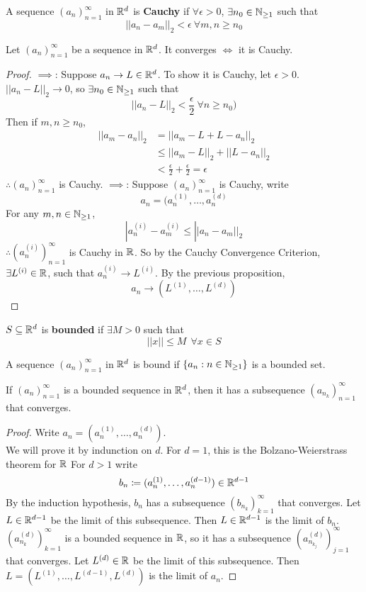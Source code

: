 \documentclass[openany]{report}
\begin{document}
\begin{definition}
    A sequence $(a_n)_{n=1}^\infty$ in $\mathbb{R}^d$ is \textbf{Cauchy} if  $\forall \epsilon > 0$, $\exists n_0 \in \mathbb{N}_{\geq 1}$ such that 
    $$||a_n - a_m||_2 < \epsilon \ \forall m,n \geq n_0$$
\end{definition}

\begin{theorem}
Let $(a_n)_{n=1}^\infty$ be a sequence in $\mathbb{R}^d$. It converges $\iff$ it is Cauchy.
\end{theorem}

\begin{proof}
    $\implies$: Suppose $a_n \rightarrow L \in \mathbb{R}^d$. To show it is Cauchy, let $\epsilon > 0$. $||a_n - L||_2 \rightarrow 0$, so $\exists n_0 \in \mathbb{N}_{\geq 1}$ such that 
    $$||a_n - L||_2 < \frac{\epsilon}{2} \ \forall n \geq n_0)$$
    Then if $m,n \geq n_0$, 
    \begin{align*}
        ||a_m - a_n||_2 &= ||a_m - L + L - a_n||_2\\
        &\leq ||a_m - L||_2 + ||L - a_n||_2\\
        &< \frac{\epsilon}{2} + \frac{\epsilon}{2} = \epsilon
    \end{align*}
        $\therefore (a_n)_{n=1}^\infty$ is Cauchy.
    $\implies$: Suppose $(a_n)_{n=1}^\infty$ is Cauchy, write 
    $$a_n = (a_n^{(1)}, \dots, a_n^{(d)}$$
    For any $m,n \in \mathbb{N}_{\geq 1}$,
    $$|a_n^{(i)} - a_m^{(i)} \leq ||a_n - a_m||_2$$
    $\therefore (a_n^{(i)})_{n=1}^\infty$ is Cauchy in $\mathbb{R}$. So by the Cauchy Convergence Criterion, $\exists L^{(i)} \in \mathbb{R}$, such that $a_n^{(i)} \rightarrow L^{(i)}$. By the previous proposition,
    $$a_n \rightarrow (L^{(1)}, \dots, L^{(d)})$$
\end{proof}
\begin{definition}
    $S \subseteq \mathbb{R}^d$ is \textbf{bounded} if $\exists M > 0$ such that 
    $$||x|| \leq M \ \ \forall x \in S$$
\end{definition}
A sequence $(a_n)_{n=1}^\infty$ in $\mathbb{R}^d$ is bound if
$\{a_n: n \in \mathbb{N}_{\geq 1}\}$ is a bounded set.
\begin{theorem}
    If $(a_n)_{n=1}^\infty$ is a bounded sequence in $\mathbb{R}^d$, then it has a subsequence $(a_{n_k})_{n=1}^\infty$ that converges.
\end{theorem}
\begin{proof}
    Write $a_n = (a_n^{(1)}, \dots, a_n^{(d)})$.\\ 
    We will prove it by indunction on $d$. For $d = 1$, this is the Bolzano-Weierstrass theorem for $\mathbb{R}$ For $d>1$ write
    \[b_n \coloneq (a_n^{(1)}, \ldots, a_n^{(d-1)}) \in \mathbb{R}^{d-1}\]
    By the induction hypothesis, $b_n$ has a subsequence $(b_{n_k})_{k=1}^\infty$ that converges. Let $L \in \mathbb{R}^{d-1}$ be the limit of this subsequence. Then $L \in \mathbb{R}^{d-1}$ is the limit of $b_n$. $(a^{(d)}_{n_k})^\infty_{k=1}$ is a bounded sequence in $\mathbb{R}$, so it has a subsequence $(a^{(d)}_{n_{k_j}})^\infty_{j=1}$ that converges. Let $L^{(d)} \in \mathbb{R}$ be the limit of this subsequence. Then $L = (L^{(1)}, \ldots, L^{(d-1)}, L^{(d)})$ is the limit of $a_n$.
\end{proof}
\end{document}
